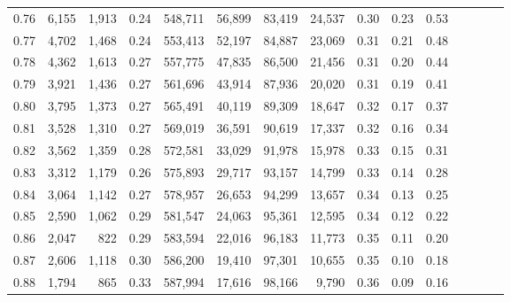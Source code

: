 \begin{tabular}{rrrcrrrrrrrrrrr}
0.76 &   6,155 &  1,913 &                                       0.24 &  548,711 &   56,899 &   83,419 &   24,537 &  0.30 &  0.23 &                         0.53 \\
0.77 &   4,702 &  1,468 &                                       0.24 &  553,413 &   52,197 &   84,887 &   23,069 &  0.31 &  0.21 &                         0.48 \\
0.78 &   4,362 &  1,613 &                                       0.27 &  557,775 &   47,835 &   86,500 &   21,456 &  0.31 &  0.20 &                         0.44 \\
0.79 &   3,921 &  1,436 &                                       0.27 &  561,696 &   43,914 &   87,936 &   20,020 &  0.31 &  0.19 &                         0.41 \\
0.80 &   3,795 &  1,373 &                                       0.27 &  565,491 &   40,119 &   89,309 &   18,647 &  0.32 &  0.17 &                         0.37 \\
0.81 &   3,528 &  1,310 &                                       0.27 &  569,019 &   36,591 &   90,619 &   17,337 &  0.32 &  0.16 &                         0.34 \\
0.82 &   3,562 &  1,359 &                                       0.28 &  572,581 &   33,029 &   91,978 &   15,978 &  0.33 &  0.15 &                         0.31 \\
0.83 &   3,312 &  1,179 &                                       0.26 &  575,893 &   29,717 &   93,157 &   14,799 &  0.33 &  0.14 &                         0.28 \\
0.84 &   3,064 &  1,142 &                                       0.27 &  578,957 &   26,653 &   94,299 &   13,657 &  0.34 &  0.13 &                         0.25 \\
0.85 &   2,590 &  1,062 &                                       0.29 &  581,547 &   24,063 &   95,361 &   12,595 &  0.34 &  0.12 &                         0.22 \\
0.86 &   2,047 &    822 &                                       0.29 &  583,594 &   22,016 &   96,183 &   11,773 &  0.35 &  0.11 &                         0.20 \\
0.87 &   2,606 &  1,118 &                                       0.30 &  586,200 &   19,410 &   97,301 &   10,655 &  0.35 &  0.10 &                         0.18 \\
0.88 &   1,794 &    865 &                                       0.33 &  587,994 &   17,616 &   98,166 &    9,790 &  0.36 &  0.09 &                         0.16 \\

\end{tabular}
